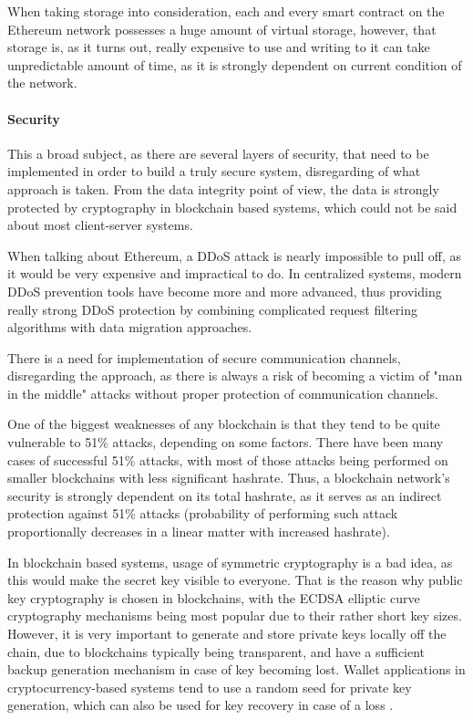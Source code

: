 When taking storage into consideration, each and every smart contract on the Ethereum network possesses a huge amount of virtual storage, however, that storage is, as it turns out, really expensive to use and writing to it can take unpredictable amount of time, as it is strongly dependent on current condition of the network.

\paragraph{Security}
This a broad subject, as there are several layers of security, that need to be implemented in order to build a truly secure system, disregarding of what approach is taken. From the data integrity point of view, the data is strongly protected by cryptography in blockchain based systems, which could not be said about most client-server systems. 

When talking about Ethereum, a DDoS attack is nearly impossible to pull off, as it would be very expensive and impractical to do. In centralized systems, modern DDoS prevention tools have become more and more advanced, thus providing really strong DDoS protection by combining complicated request filtering algorithms with data migration approaches. 

There is a need for implementation of secure communication channels, disregarding the approach, as there is always a risk of becoming a victim of "man in the middle" attacks without proper protection of communication channels.

One of the biggest weaknesses of any blockchain is that they tend to be quite vulnerable to 51\% attacks, depending on some factors. There have been many cases of successful 51\% attacks, with most of those attacks being performed on smaller blockchains with less significant hashrate. Thus, a blockchain network's security is strongly dependent on its total hashrate, as it serves as an indirect protection against 51\% attacks (probability of performing such attack proportionally decreases in a linear matter with increased hashrate).

In blockchain based systems, usage of symmetric cryptography is a bad idea, as this would make the secret key visible to everyone. That is the reason why public key cryptography is chosen in blockchains, with the ECDSA elliptic curve cryptography mechanisms being most popular due to their rather short key sizes. However, it is very important to generate and store private keys locally off the chain, due to blockchains typically being transparent, and have a sufficient backup generation mechanism in case of key becoming lost. Wallet applications in cryptocurrency-based systems tend to use a random seed for private key generation, which can also be used for key recovery in case of a loss \citep{walletseed}.

